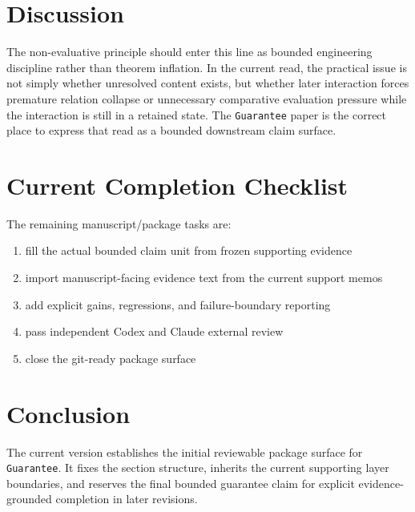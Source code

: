 \documentclass[11pt]{article}
\begin{document}
\section{Discussion}

The non-evaluative principle should enter this line as bounded engineering
discipline rather than theorem inflation. In the current read, the practical issue
is not simply whether unresolved content exists, but whether later interaction
forces premature relation collapse or unnecessary comparative evaluation pressure
while the interaction is still in a retained state. The \texttt{Guarantee} paper is
the correct place to express that read as a bounded downstream claim surface.

\section{Current Completion Checklist}

The remaining manuscript/package tasks are:
\begin{enumerate}
\item fill the actual bounded claim unit from frozen supporting evidence
\item import manuscript-facing evidence text from the current support memos
\item add explicit gains, regressions, and failure-boundary reporting
\item pass independent Codex and Claude external review
\item close the git-ready package surface
\end{enumerate}

\section{Conclusion}

The current version establishes the initial reviewable package surface for
\texttt{Guarantee}. It fixes the section structure, inherits the current supporting
layer boundaries, and reserves the final bounded guarantee claim for explicit
evidence-grounded completion in later revisions.
\end{document}

